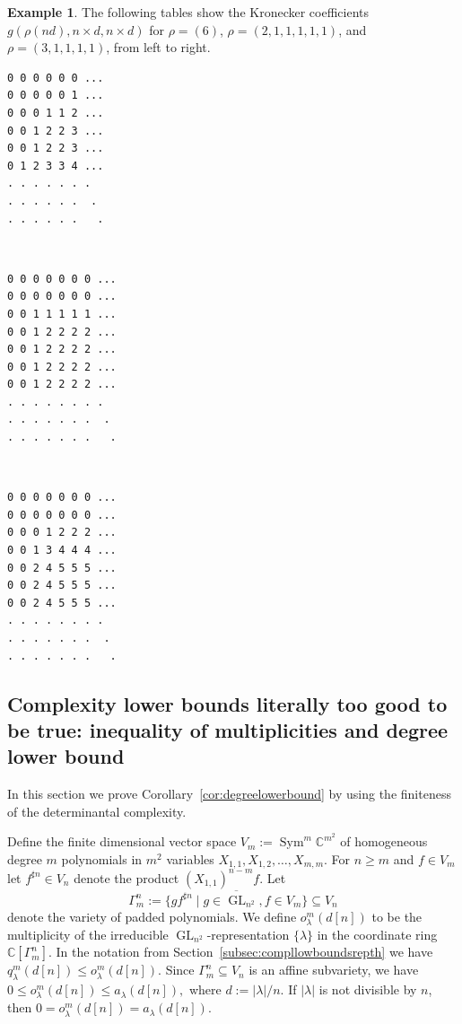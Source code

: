 \documentclass{article}
\numberwithin{equation}{section}
\theoremstyle{definition}
\newtheorem{example}[equation]{Example}
\newcommand{\rightbox}{\hfill\scalebox{0.8}{$\blacksquare$}}
\def\la{\lambda}
\newcommand{\IC}{\mathbb C}
\DeclareMathOperator{\GL}{GL}
\DeclareMathOperator{\Sym}{Sym}
\begin{document}
\begin{example}
The following tables show the Kronecker coefficients $g(\rho(nd),n \times d, n\times d)$ for $\rho=(6)$, $\rho=(2,1,1,1,1,1)$, and $\rho=(3,1,1,1,1)$,
from left to right.
\begin{center}
\begin{minipage}{11cm}
\begin{minipage}{3cm}
\begin{verbatim}
0 0 0 0 0 0 ...
0 0 0 0 0 1 ...
0 0 0 1 1 2 ...
0 0 1 2 2 3 ...
0 0 1 2 2 3 ...
0 1 2 3 3 4 ...
. . . . . . .
. . . . . .  .
. . . . . .   .
\end{verbatim}
\end{minipage}
\mbox{~~~~~}
\begin{minipage}{3cm}
\begin{verbatim}
0 0 0 0 0 0 0 ...
0 0 0 0 0 0 0 ...
0 0 1 1 1 1 1 ...
0 0 1 2 2 2 2 ...
0 0 1 2 2 2 2 ...
0 0 1 2 2 2 2 ...
0 0 1 2 2 2 2 ...
. . . . . . . .
. . . . . . .  .
. . . . . . .   .
\end{verbatim}
\end{minipage}
\mbox{~~~~~}
\begin{minipage}{3cm}
\begin{verbatim}
0 0 0 0 0 0 0 ...
0 0 0 0 0 0 0 ...
0 0 0 1 2 2 2 ...
0 0 1 3 4 4 4 ...
0 0 2 4 5 5 5 ...
0 0 2 4 5 5 5 ...
0 0 2 4 5 5 5 ...
. . . . . . . .
. . . . . . .  .
. . . . . . .   .
\end{verbatim}
\end{minipage}
\end{minipage}
\end{center}
\rightbox
\end{example}


\subsection{Complexity lower bounds literally too good to be true: inequality of multiplicities and degree lower bound}\label{subsec:infgoodlow}
In this section we prove Corollary~\ref{cor:degreelowerbound} by using the finiteness of the determinantal complexity.

Define the finite dimensional vector space $V_m := \Sym^m \IC^{m^2}$ of homogeneous degree $m$ polynomials in $m^2$ variables $X_{1,1}, X_{1,2}, \ldots, X_{m,m}$.
For $n\geq m$ and $f \in V_m$
let $f^{\sharp n} \in V_n$ denote the product $(X_{1,1})^{n-m} f$.
Let \[\Gamma_m^n := \overline{ \{ g f^{\sharp n} \mid g \in \GL_{n^2}, f \in V_m\}} \subseteq V_n\] denote the variety of padded polynomials.
We define $o^{m}_\la(d[n])$
to be the multiplicity of the irreducible $\GL_{n^2}$-representation $\{\la\}$ in the coordinate ring $\IC [ \Gamma_m^n ]$.
In the notation from Section~\ref{subsec:compllowboundsrepth} we have
$q^m_\la(d[n])\leq o^{m}_\la(d[n])$.
Since $\Gamma_m^n \subseteq V_n$ is an affine subvariety, we have
$
0 \leq o_\la^m(d[n]) \leq a_\la(d[n]),
$
where $d := |\la|/n$. If $|\la|$ is not divisible by $n$, then $0 = o_\la^m(d[n]) = a_\la(d[n])$.
\end{document}
